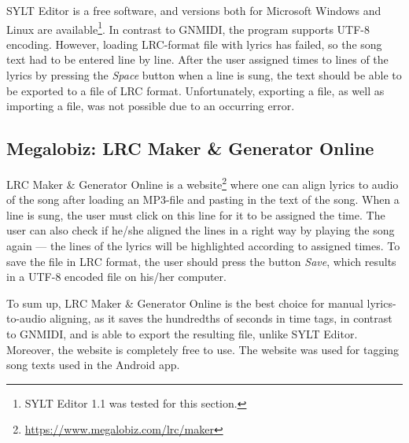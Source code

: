 SYLT Editor is a free software, and versions both for Microsoft Windows and Linux are available\footnote{SYLT Editor 1.1 was tested for this section.}. In contrast to GNMIDI, the program supports UTF-8 encoding. However, loading LRC-format file with lyrics has failed, so the song text had to be entered line by line. After the user assigned times to lines of the lyrics by pressing the \textit{Space} button when a line is sung, the text should be able to be exported to a file of LRC format. Unfortunately, exporting a file, as well as importing a file, was not possible due to an occurring error.

\subsection{Megalobiz: LRC Maker \& Generator Online}

LRC Maker \& Generator Online is a website\footnote{\url{https://www.megalobiz.com/lrc/maker}} where one can align lyrics to audio of the song after loading an MP3-file and pasting in the text of the song. When a line is sung, the user must click on this line for it to be assigned the time. The user can also check if he/she aligned the lines in a right way by playing the song again --- the lines of the lyrics will be highlighted according to assigned times. To save the file in LRC format, the user should press the button \textit{Save}, which results in a UTF-8 encoded file on his/her computer.

To sum up, LRC Maker \& Generator Online is the best choice for manual lyrics-to-audio aligning, as it saves the hundredths of seconds in time tags, in contrast to GNMIDI, and is able to export the resulting file, unlike SYLT Editor. Moreover, the website is completely free to use. The website was used for tagging song texts used in the Android app.